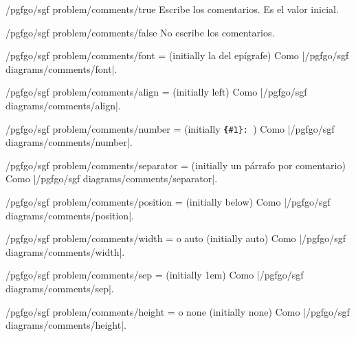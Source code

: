 \begin{stylekey}{/pgfgo/sgf problem/comments/true}
	Escribe los comentarios. Es el valor inicial.
\end{stylekey}

\begin{stylekey}{/pgfgo/sgf problem/comments/false}
	No escribe los comentarios.
\end{stylekey}

\begin{key}{/pgfgo/sgf problem/comments/font =  (initially la del epígrafe)}
	Como |/pgfgo/sgf diagrams/comments/font|.
\end{key}

\begin{key}{/pgfgo/sgf problem/comments/align =  (initially left)}
	Como |/pgfgo/sgf diagrams/comments/align|.
\end{key}

\begin{key}{/pgfgo/sgf problem/comments/number =  (initially \texttt{\string\textbf\{\#1\}:\string~})}
	Como |/pgfgo/sgf diagrams/comments/number|.
\end{key}

\begin{key}{/pgfgo/sgf problem/comments/separator =  (initially un párrafo por comentario)}
	Como |/pgfgo/sgf diagrams/comments/separator|.
\end{key}

\begin{key}{/pgfgo/sgf problem/comments/position =  (initially below)}
	Como |/pgfgo/sgf diagrams/comments/position|.
\end{key}

\begin{key}{/pgfgo/sgf problem/comments/width =  o auto (initially auto)}
	Como |/pgfgo/sgf diagrams/comments/width|.
\end{key}

\begin{key}{/pgfgo/sgf problem/comments/sep =  (initially 1em)}
	Como |/pgfgo/sgf diagrams/comments/sep|.
\end{key}

\begin{key}{/pgfgo/sgf problem/comments/height =  o none (initially none)}
	Como |/pgfgo/sgf diagrams/comments/height|.
\end{key}

